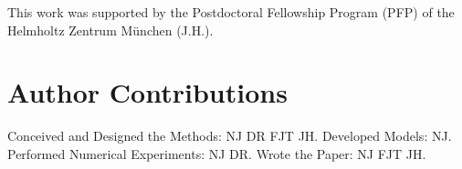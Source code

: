 \documentclass[10pt,letterpaper]{article}
\begin{document}
This work was supported by the Postdoctoral Fellowship Program (PFP) of the Helmholtz Zentrum M\"unchen (J.H.).

\section*{Author Contributions}

Conceived and Designed the Methods: NJ DR FJT JH.
Developed Models: NJ.
Performed Numerical Experiments: NJ DR.
Wrote the Paper: NJ FJT JH.

\nolinenumbers



\end{document}
